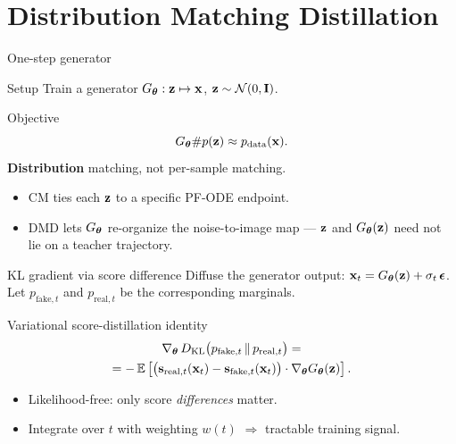 \documentclass{beamer}
\renewcommand{\eqpause}{}
\begin{document}
\section{Distribution Matching Distillation}
\begin{frame}{One-step generator}
	\begin{block}{Setup}
		Train a generator $G_{\boldsymbol{\theta}}: \mathbf{z} \mapsto \mathbf{x}$, $\mathbf{z} \sim \mathcal{N}(0, \mathbf{I})$.
	\end{block}
	\eqpause
	\begin{block}{Objective}
		\vspace{-0.3cm}
		\[
			G_{\boldsymbol{\theta}} \# p(\mathbf{z}) \approx p_{\text{data}}(\mathbf{x}).
		\]
		\textbf{Distribution} matching, not per-sample matching.
	\end{block}
	\eqpause
	\begin{itemize}
		\item CM ties each $\mathbf{z}$ to a specific PF-ODE endpoint.
		\item DMD lets $G_{\boldsymbol{\theta}}$ re-organize the noise-to-image map --- $\mathbf{z}$ and $G_{\boldsymbol{\theta}}(\mathbf{z})$ need not lie on a teacher trajectory.
	\end{itemize}
\end{frame}
\begin{frame}{KL gradient via score difference}
	Diffuse the generator output: $\mathbf{x}_t = G_{\boldsymbol{\theta}}(\mathbf{z}) + \sigma_t\, \boldsymbol{\epsilon}$. Let $p_{\text{fake}, t}$ and $p_{\text{real}, t}$ be the corresponding marginals.
	\eqpause
	\begin{block}{Variational score-distillation identity}
		\vspace{-0.6cm}
		\begin{multline*}
			\nabla_{\boldsymbol{\theta}}\, D_\mathrm{KL}\bigl(p_{\text{fake}, t} \,\|\, p_{\text{real}, t}\bigr) = \\
			= -\, \mathbb{E} \left[\bigl(\mathbf{s}_{\text{real}, t}(\mathbf{x}_t) - \mathbf{s}_{\text{fake}, t}(\mathbf{x}_t)\bigr) \cdot \nabla_{\boldsymbol{\theta}} G_{\boldsymbol{\theta}}(\mathbf{z}) \right].
		\end{multline*}
		\vspace{-0.5cm}
	\end{block}
	\eqpause
	\begin{itemize}
		\item Likelihood-free: only score \emph{differences} matter.
		\item Integrate over $t$ with weighting $w(t)$ $\Rightarrow$ tractable training signal.
	\end{itemize}
\end{frame}
\end{document}
